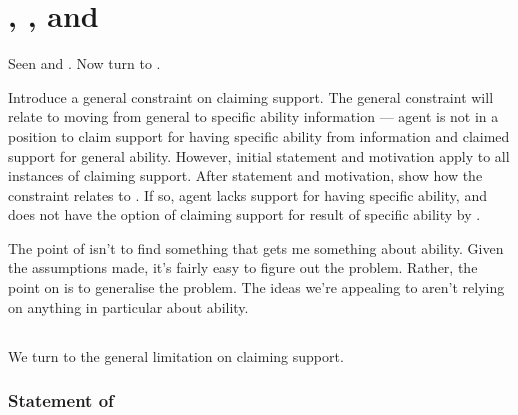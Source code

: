 \chapter{\nI{}, \gsi{}, and }
\label{sec:second-conditional}

\begin{note}
  Seen \ESU{} and \adB{}.
  Now turn to \adA{}.
\end{note}

\begin{note}
  Introduce a general constraint on claiming support.
  The general constraint will relate to moving from general to specific ability information --- agent is not in a position to claim support for having specific ability from information and claimed support for general ability.
  However, initial statement and motivation apply to all instances of claiming support.
  After statement and motivation, show how the constraint relates to \adA{}.
  If so, agent lacks support for having specific ability, and does not have the option of claiming support for result of specific ability by \adA{}.
\end{note}

\begin{note}
  \color{red}
  The point of \nI{} isn't to find something that gets me something about ability.
  Given the assumptions made, it's fairly easy to figure out the problem.
  Rather, the point on \nI{} is to generalise the problem.
  The ideas we're appealing to aren't relying on anything in particular about ability.
\end{note}

\section{\nI{-}}
\label{sec:ni-1}

\begin{note}
  We turn to the general limitation on claiming support.
\end{note}

\subsection{Statement of \nI{}}

